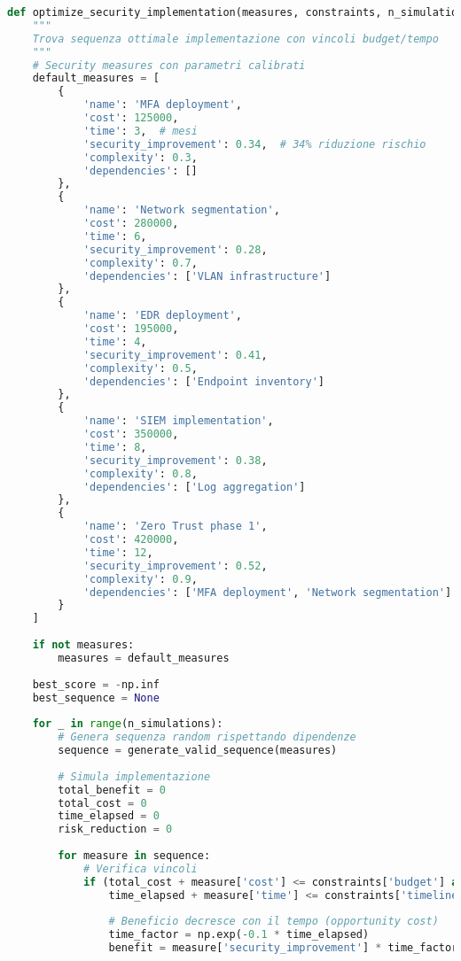 \begin{lstlisting}[language=Python, caption=Ottimizzazione Sequenza Implementazione Security]
def optimize_security_implementation(measures, constraints, n_simulations=10000):
    """
    Trova sequenza ottimale implementazione con vincoli budget/tempo
    """
    # Security measures con parametri calibrati
    default_measures = [
        {
            'name': 'MFA deployment',
            'cost': 125000,
            'time': 3,  # mesi
            'security_improvement': 0.34,  # 34% riduzione rischio
            'complexity': 0.3,
            'dependencies': []
        },
        {
            'name': 'Network segmentation',
            'cost': 280000,
            'time': 6,
            'security_improvement': 0.28,
            'complexity': 0.7,
            'dependencies': ['VLAN infrastructure']
        },
        {
            'name': 'EDR deployment',
            'cost': 195000,
            'time': 4,
            'security_improvement': 0.41,
            'complexity': 0.5,
            'dependencies': ['Endpoint inventory']
        },
        {
            'name': 'SIEM implementation',
            'cost': 350000,
            'time': 8,
            'security_improvement': 0.38,
            'complexity': 0.8,
            'dependencies': ['Log aggregation']
        },
        {
            'name': 'Zero Trust phase 1',
            'cost': 420000,
            'time': 12,
            'security_improvement': 0.52,
            'complexity': 0.9,
            'dependencies': ['MFA deployment', 'Network segmentation']
        }
    ]
    
    if not measures:
        measures = default_measures
    
    best_score = -np.inf
    best_sequence = None
    
    for _ in range(n_simulations):
        # Genera sequenza random rispettando dipendenze
        sequence = generate_valid_sequence(measures)
        
        # Simula implementazione
        total_benefit = 0
        total_cost = 0
        time_elapsed = 0
        risk_reduction = 0
        
        for measure in sequence:
            # Verifica vincoli
            if (total_cost + measure['cost'] <= constraints['budget'] and
                time_elapsed + measure['time'] <= constraints['timeline']):
                
                # Beneficio decresce con il tempo (opportunity cost)
                time_factor = np.exp(-0.1 * time_elapsed)
                benefit = measure['security_improvement'] * time_factor
                

\end{lstlisting}
